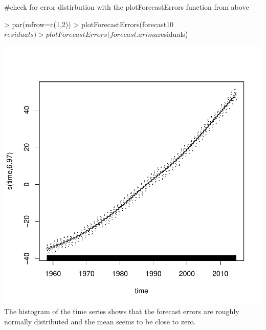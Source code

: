 \documentclass[11pt, a4paper]{article} %
\begin{document}
#check for error distirbution with the plotForecastErrors function from above 
\begin{Schunk}
\begin{Sinput}
> par(mfrow=c(1,2))
> plotForecastErrors(forecast10$residuals)
> plotForecastErrors(forecast.arima$residuals)
\end{Sinput}
\end{Schunk}
\includegraphics{alleselena-067}
\noindent The histogram of the time series shows that the forecast errors are roughly normally distributed and the mean seems to be close to zero.\\
\end{document}
